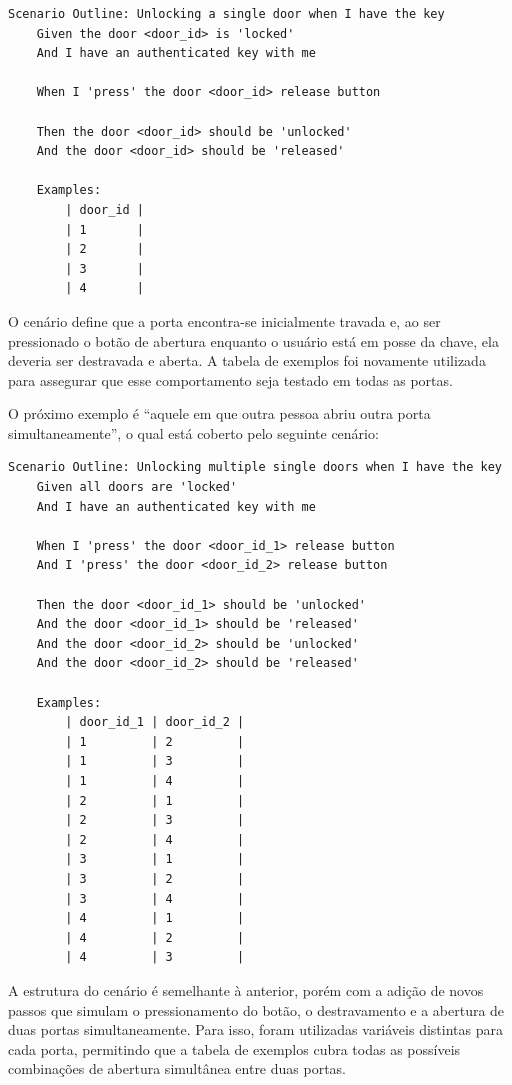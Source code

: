 \begin{verbatim}
Scenario Outline: Unlocking a single door when I have the key
    Given the door <door_id> is 'locked'
    And I have an authenticated key with me

    When I 'press' the door <door_id> release button

    Then the door <door_id> should be 'unlocked'
    And the door <door_id> should be 'released'

    Examples:
        | door_id |
        | 1       |
        | 2       |
        | 3       |
        | 4       |
\end{verbatim}

O cenário define que a porta encontra-se inicialmente travada e, ao ser pressionado o botão de abertura enquanto o usuário está em posse da chave, ela deveria 
ser destravada e aberta. A tabela de exemplos foi novamente utilizada para assegurar que esse comportamento seja testado em todas as portas.

O próximo exemplo é ``aquele em que outra pessoa abriu outra porta simultaneamente'', o qual está coberto pelo seguinte cenário:

\begin{verbatim}
Scenario Outline: Unlocking multiple single doors when I have the key   
    Given all doors are 'locked'
    And I have an authenticated key with me

    When I 'press' the door <door_id_1> release button
    And I 'press' the door <door_id_2> release button

    Then the door <door_id_1> should be 'unlocked'
    And the door <door_id_1> should be 'released'
    And the door <door_id_2> should be 'unlocked'
    And the door <door_id_2> should be 'released'

    Examples:
        | door_id_1 | door_id_2 |
        | 1         | 2         |
        | 1         | 3         |
        | 1         | 4         |
        | 2         | 1         |
        | 2         | 3         |
        | 2         | 4         |
        | 3         | 1         |
        | 3         | 2         |
        | 3         | 4         |
        | 4         | 1         |
        | 4         | 2         |
        | 4         | 3         |
\end{verbatim}

A estrutura do cenário é semelhante à anterior, porém com a adição de novos passos que simulam o pressionamento do botão, o destravamento e a abertura de duas 
portas simultaneamente. Para isso, foram utilizadas variáveis distintas para cada porta, permitindo que a tabela de exemplos cubra todas as possíveis combinações 
de abertura simultânea entre duas portas.

